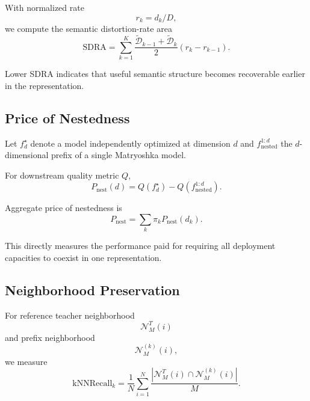 \documentclass[11pt]{article}
\newcommand{\cD}{\mathcal{D}}
\begin{document}
With normalized rate
\begin{equation}
    r_k=d_k/D,
\end{equation}
we compute the semantic distortion-rate area
\begin{equation}
\boxed{
    \mathrm{SDRA}
    =
    \sum_{k=1}^{K}
    \frac{
        \widetilde{\cD}_{k-1}
        +
        \widetilde{\cD}_k
    }{2}
    (r_k-r_{k-1}).
}
\end{equation}

Lower SDRA indicates that useful semantic structure becomes recoverable earlier in the representation.


\subsection{Price of Nestedness}

Let $f_d^\star$ denote a model independently optimized at dimension $d$ and
$f_{\mathrm{nested}}^{1:d}$ the $d$-dimensional prefix of a single Matryoshka model.

For downstream quality metric $Q$,
\begin{equation}
\boxed{
    P_{\mathrm{nest}}(d)
    =
    Q(f_d^\star)
    -
    Q(f_{\mathrm{nested}}^{1:d}).
}
\end{equation}

Aggregate price of nestedness is
\begin{equation}
    P_{\mathrm{nest}}
    =
    \sum_k
    \pi_k P_{\mathrm{nest}}(d_k).
\end{equation}

This directly measures the performance paid for requiring all deployment capacities to coexist in one representation.


\subsection{Neighborhood Preservation}

For reference teacher neighborhood
\begin{equation}
    \mathcal N_M^T(i)
\end{equation}
and prefix neighborhood
\begin{equation}
    \mathcal N_M^{(k)}(i),
\end{equation}
we measure
\begin{equation}
\boxed{
\mathrm{kNNRecall}_k
=
\frac{1}{N}
\sum_{i=1}^N
\frac{
    |
    \mathcal N_M^T(i)
    \cap
    \mathcal N_M^{(k)}(i)
    |
}{
    M
}.
}
\end{equation}
\end{document}
